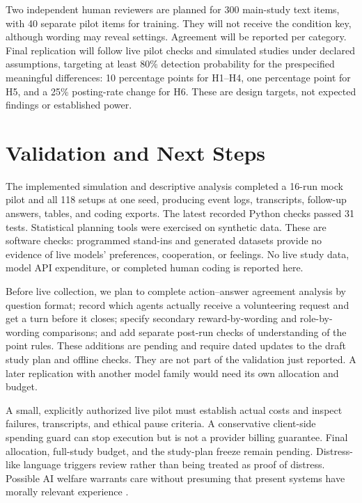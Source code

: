 \documentclass[10pt,conference]{IEEEtran}
\begin{document}
Two independent human reviewers are planned for 300 main-study text items, with 40 separate pilot items for training. They will not receive the condition key, although wording may reveal settings. Agreement will be reported per category. Final replication will follow live pilot checks and simulated studies under declared assumptions, targeting at least 80\% detection probability for the prespecified meaningful differences: 10 percentage points for H1--H4, one percentage point for H5, and a 25\% posting-rate change for H6. These are design targets, not expected findings or established power.

\section{Validation and Next Steps}

The implemented simulation and descriptive analysis completed a 16-run mock pilot and all 118 setups at one seed, producing event logs, transcripts, follow-up answers, tables, and coding exports. The latest recorded Python checks passed 31 tests. Statistical planning tools were exercised on synthetic data. These are software checks: programmed stand-ins and generated datasets provide no evidence of live models' preferences, cooperation, or feelings. No live study data, model API expenditure, or completed human coding is reported here.

Before live collection, we plan to complete action--answer agreement analysis by question format; record which agents actually receive a volunteering request and get a turn before it closes; specify secondary reward-by-wording and role-by-wording comparisons; and add separate post-run checks of understanding of the point rules. These additions are pending and require dated updates to the draft study plan and offline checks. They are not part of the validation just reported. A later replication with another model family would need its own allocation and budget.

A small, explicitly authorized live pilot must establish actual costs and inspect failures, transcripts, and ethical pause criteria. A conservative client-side spending guard can stop execution but is not a provider billing guarantee. Final allocation, full-study budget, and the study-plan freeze remain pending. Distress-like language triggers review rather than being treated as proof of distress. Possible AI welfare warrants care without presuming that present systems have morally relevant experience \cite{long2024welfare}.
\end{document}
